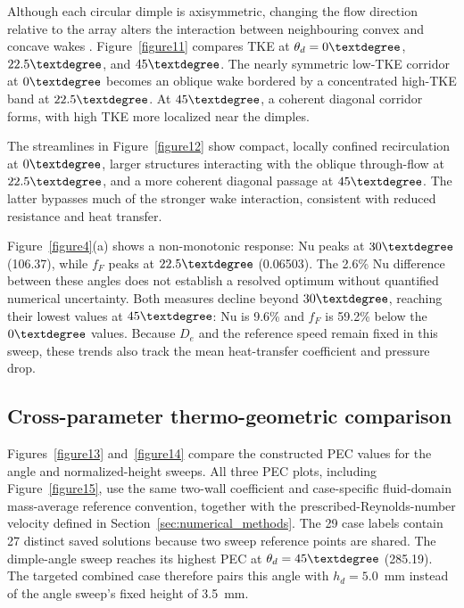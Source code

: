 \documentclass[energies,article,submit,moreauthors,noheaderline]{Definitions/mdpi}
\newcommand{\degree}{\texorpdfstring{\ensuremath{^\circ}}{\textdegree}}
\def\ensuremath#1{}%
\def\degree{\textdegree}%
\begin{document}
Although each circular dimple is axisymmetric, changing the flow direction relative to the array alters the interaction between neighbouring convex and concave wakes \citep{jiang2019a, hamedi2024}. Figure~\ref{figure11} compares TKE at $\theta_d=0\degree$, $22.5\degree$, and $45\degree$. The nearly symmetric low-TKE corridor at $0\degree$ becomes an oblique wake bordered by a concentrated high-TKE band at $22.5\degree$. At $45\degree$, a coherent diagonal corridor forms, with high TKE more localized near the dimples.





The streamlines in Figure~\ref{figure12} show compact, locally confined recirculation at $0\degree$, larger structures interacting with the oblique through-flow at $22.5\degree$, and a more coherent diagonal passage at $45\degree$. The latter bypasses much of the stronger wake interaction, consistent with reduced resistance and heat transfer.

Figure~\ref{figure4}(a) shows a non-monotonic response: Nu peaks at $30\degree$ (106.37), while $f_F$ peaks at $22.5\degree$ (0.06503). The 2.6\% Nu difference between these angles does not establish a resolved optimum without quantified numerical uncertainty. Both measures decline beyond $30\degree$, reaching their lowest values at $45\degree$: Nu is 9.6\% and $f_F$ is 59.2\% below the $0\degree$ values. Because $D_e$ and the reference speed remain fixed in this sweep, these trends also track the mean heat-transfer coefficient and pressure drop.

\subsection{Cross-parameter thermo-geometric comparison}
\label{sec:tgg_comparison}

Figures~\ref{figure13} and~\ref{figure14} compare the constructed PEC values for the angle and normalized-height sweeps. All three PEC plots, including Figure~\ref{figure15}, use the same two-wall coefficient and case-specific fluid-domain mass-average reference convention, together with the prescribed-Reynolds-number velocity defined in Section~\ref{sec:numerical_methods}. The 29 case labels contain 27 distinct saved solutions because two sweep reference points are shared. The dimple-angle sweep reaches its highest PEC at $\theta_d=45\degree$ (285.19). The targeted combined case therefore pairs this angle with $h_d=5.0$~mm instead of the angle sweep's fixed height of 3.5~mm.
\end{document}

